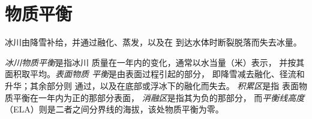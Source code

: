\section{物质平衡}\label{sec:b3:glaciology:mass-balance}

冰川由降雪补给，并通过融化、蒸发，以及在
到达水体时断裂脱落而失去冰量。

\begin{definition}\label{def:b3:glaciology:mass-balance}
\emph{冰川物质平衡}是指冰川
质量在一年内的变化，通常以水当量（米）表示，
并按其面积取平均。\emph{表面物质
平衡}是由表面过程引起的部分，
即降雪减去融化、径流和升华；其余部分则
通过，以及在底部或浮冰下的融化而失去。
\emph{积累区}是指
表面物质平衡在一年内为正的那部分表面，
\emph{消融区}是指其为负的那部分，
而\emph{平衡线高度}
（ELA）则是二者之间分界线的海拔，该处物质平衡为零。
\end{definition}

